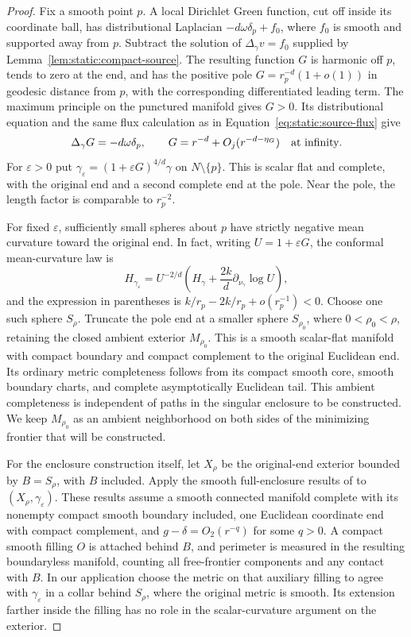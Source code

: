 \begin{proof}
Fix a smooth point $p$.  A local Dirichlet Green function, cut off
inside its coordinate ball, has distributional Laplacian
$-d\omega\delta_p+f_0$, where $f_0$ is smooth and supported away
from $p$.  Subtract the solution of
$\Delta_\gamma v=f_0$ supplied by
Lemma~\ref{lem:static:compact-source}.  The resulting function $G$
is harmonic off $p$, tends to zero at the end, and has the positive
pole $G=r_p^{-d}(1+o(1))$ in geodesic distance from $p$, with the
corresponding differentiated leading term.  The maximum principle
on the punctured manifold gives $G>0$.  Its distributional equation
and the same flux calculation as in
Equation~\eqref{eq:static:source-flux} give
\[
 \Delta_\gamma G=-d\omega\delta_p,
 \qquad G=r^{-d}+O_j(r^{-d-\eta_G})\quad\hbox{at infinity}.
\]
For $\varepsilon>0$ put
$\gamma_\varepsilon=(1+\varepsilon G)^{4/d}\gamma$ on
$N\setminus\{p\}$.  This is scalar flat and complete, with the
original end and a second complete end at the pole.  Near the pole,
the length factor is comparable to $r_p^{-2}$.

For fixed $\varepsilon$, sufficiently small spheres about $p$ have
strictly negative mean curvature toward the original end.  In fact,
writing $U=1+\varepsilon G$, the conformal mean-curvature law is
\[
 H_{\gamma_\varepsilon}
 =U^{-2/d}\left(H_\gamma+\frac{2k}{d}\partial_{\nu_\gamma}\log U\right),
\]
and the expression in parentheses is
$k/r_p-2k/r_p+o(r_p^{-1})<0$.
Choose one such sphere $S_\rho$.  Truncate the pole end at a
smaller sphere $S_{\rho_0}$, where $0<\rho_0<\rho$, retaining the
closed ambient exterior $M_{\rho_0}$.  This is a smooth scalar-flat
manifold with compact boundary and compact complement to the original
Euclidean end.  Its ordinary metric completeness follows from its
compact smooth core, smooth boundary charts, and complete
asymptotically Euclidean tail.  This ambient completeness is independent
of paths in the singular enclosure to be constructed.  We keep
$M_{\rho_0}$ as an ambient neighborhood on both sides of the minimizing
frontier that will be constructed.

For the enclosure construction itself, let $X_\rho$ be the original-end
exterior bounded by $B=S_\rho$, with $B$ included.  Apply the smooth
full-enclosure results of
\cite[Lemmas~2.1--2.3]{CompanionRiemannian} to
$(X_\rho,\gamma_\varepsilon)$.  These results assume a smooth connected
manifold complete with its nonempty compact smooth boundary included,
one Euclidean coordinate end with compact complement, and
$g-\delta=O_2(r^{-q})$ for some $q>0$.  A compact smooth filling $O$
is attached behind $B$, and perimeter is measured in the resulting
boundaryless manifold, counting all free-frontier components and any
contact with $B$.  In our application choose the metric on that
auxiliary filling to agree with $\gamma_\varepsilon$ in a collar
behind $S_\rho$, where the original metric is smooth.  Its extension
farther inside the filling has no role in the scalar-curvature
argument on the exterior.


\end{proof}
